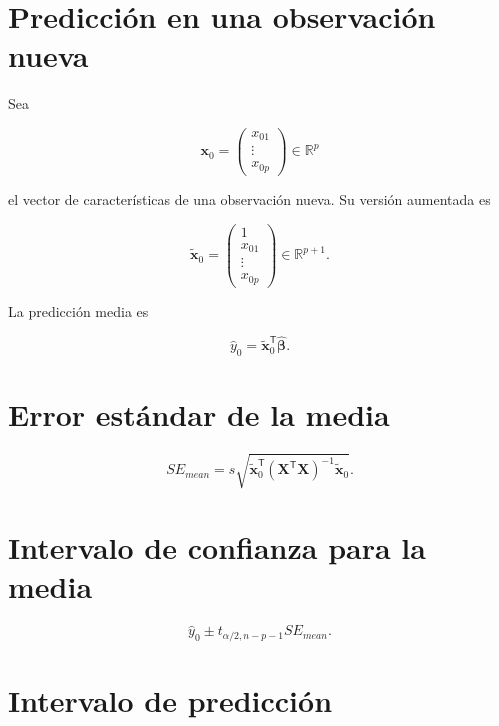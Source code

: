 \documentclass[
  spanish,
  10.5pt,
  letterpaper,
  DIV=11,
  numbers=noendperiod,
  oneside,
  open=any]{scrreprt}
\theoremstyle{definition}
\theoremstyle{definition}
\theoremstyle{plain}
\theoremstyle{remark}
\begin{document}
\section*{Predicción en una observación
nueva}\label{predicciuxf3n-en-una-observaciuxf3n-nueva}


Sea

\[
\mathbf{x}_0
=
\begin{pmatrix}
x_{01}\\
\vdots\\
x_{0p}
\end{pmatrix}
\in\mathbb{R}^{p}
\]

el vector de características de una observación nueva. Su versión
aumentada es

\[
\widetilde{\mathbf{x}}_0
=
\begin{pmatrix}
1\\
x_{01}\\
\vdots\\
x_{0p}
\end{pmatrix}
\in\mathbb{R}^{p+1}.
\]

La predicción media es

\[
\widehat{y}_0
=
\widetilde{\mathbf{x}}_0^{\mathsf T}
\widehat{\boldsymbol{\beta}}.
\]

\section*{Error estándar de la
media}\label{error-estuxe1ndar-de-la-media}


\[
SE_{mean}
=
s
\sqrt{
\widetilde{\mathbf{x}}_0^{\mathsf T}
(\mathbf{X}^{\mathsf T}\mathbf{X})^{-1}
\widetilde{\mathbf{x}}_0
}.
\]

\section*{Intervalo de confianza para la
media}\label{intervalo-de-confianza-para-la-media}


\[
\widehat{y}_0
\pm
t_{\alpha/2,n-p-1}
SE_{mean}.
\]

\section*{Intervalo de predicción}\label{intervalo-de-predicciuxf3n}
\end{document}
